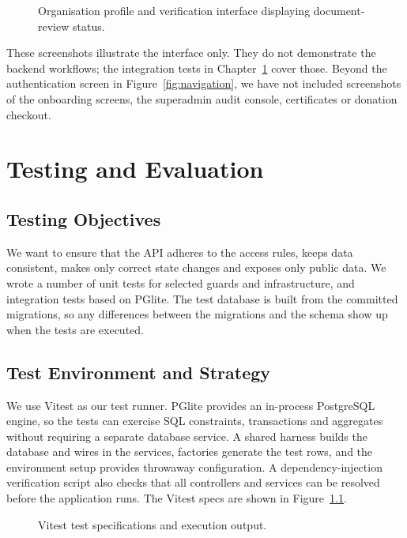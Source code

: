 \begin{figure}[H]
\centering
{}
\caption{Organisation profile and verification interface displaying document-review status.}
\label{fig:org-verification}
\end{figure}

\noindent These screenshots illustrate the interface only. They do not demonstrate the backend workflows; the integration tests in Chapter~\ref{ch:testing} cover those. Beyond the authentication screen in Figure~\ref{fig:navigation}, we have not included screenshots of the onboarding screens, the superadmin audit console, certificates or donation checkout.

\chapter{Testing and Evaluation}
\label{ch:testing}

\section{Testing Objectives}
\label{sec:testing-objectives}
We want to ensure that the API adheres to the access rules, keeps data consistent, makes only correct state changes and exposes only public data. We wrote a number of unit tests for selected guards and infrastructure, and integration tests based on PGlite. The test database is built from the committed migrations, so any differences between the migrations and the schema show up when the tests are executed.

\section{Test Environment and Strategy}
We use Vitest as our test runner. PGlite provides an in-process PostgreSQL engine, so the tests can exercise SQL constraints, transactions and aggregates without requiring a separate database service. A shared harness builds the database and wires in the services, factories generate the test rows, and the environment setup provides throwaway configuration. A dependency-injection verification script also checks that all controllers and services can be resolved before the application runs. The Vitest specs are shown in Figure~\ref{fig:testing}.

\begin{figure}[H]
    \centering
    \caption{Vitest test specifications and execution output.}
    \label{fig:testing}
\end{figure}

